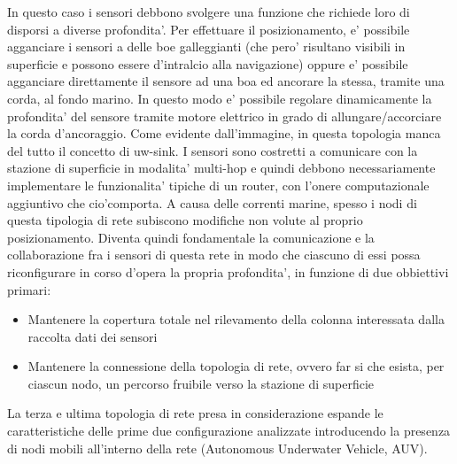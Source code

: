 In questo caso i sensori debbono svolgere una funzione che richiede loro di disporsi a diverse profondita'. \newline Per effettuare il posizionamento, e' possibile agganciare i sensori a delle boe galleggianti (che pero' risultano visibili in superficie e possono essere d'intralcio alla navigazione) oppure e' possibile agganciare direttamente il sensore ad una boa ed ancorare la stessa, tramite una corda, al fondo marino. \newline In questo modo e' possibile regolare dinamicamente la profondita' del sensore tramite motore elettrico in grado di allungare/accorciare la corda d'ancoraggio. Come evidente dall'immagine, in questa topologia manca del tutto il concetto di uw-sink. \newline I sensori sono costretti a comunicare con la stazione di superficie in modalita' multi-hop e quindi debbono necessariamente implementare le funzionalita' tipiche di un router, con l'onere computazionale aggiuntivo che cio'comporta. \newline A causa delle correnti marine, spesso i nodi di questa tipologia di rete subiscono modifiche non volute al proprio posizionamento. \newline Diventa quindi fondamentale la comunicazione e la collaborazione fra i sensori di questa rete in modo che ciascuno di essi possa riconfigurare in corso d'opera la propria profondita', in funzione di due obbiettivi primari:
\begin{itemize}

 \item Mantenere la copertura totale nel rilevamento della colonna interessata dalla raccolta dati dei sensori

\item Mantenere la connessione della topologia di rete, ovvero far si che esista, per ciascun nodo, un percorso fruibile verso la stazione di superficie
\end{itemize}

La terza e ultima topologia di rete presa in considerazione espande le caratteristiche delle prime due configurazione analizzate introducendo la presenza di nodi mobili all'interno della rete (Autonomous Underwater Vehicle, AUV).

